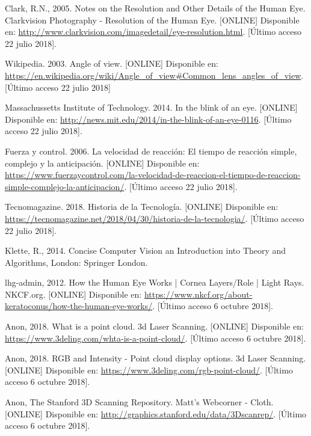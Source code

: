 \begin{thebibliography}{99}
 Clark, R.N., 2005. Notes on the Resolution and Other Details of the Human Eye. Clarkvision Photography - Resolution of the Human Eye. [ONLINE] Disponible en: \url{http://www.clarkvision.com/imagedetail/eye-resolution.html}. [Último acceso 22 julio 2018].



 Wikipedia. 2003. Angle of view. [ONLINE] Disponible en: \url{https://en.wikipedia.org/wiki/Angle_of_view#Common_lens_angles_of_view}. [Último acceso 22 julio 2018]

 Massachussetts Institute of Technology. 2014. In the blink of an eye. [ONLINE] Disponible en: \url{http://news.mit.edu/2014/in-the-blink-of-an-eye-0116}. [Último acceso 22 julio 2018].

 Fuerza y control. 2006. La velocidad de reacción: El tiempo de reacción simple, complejo y la anticipación. [ONLINE] Disponible en: \url{https://www.fuerzaycontrol.com/la-velocidad-de-reaccion-el-tiempo-de-reaccion-simple-complejo-la-anticipacion/}. [Último acceso 22 julio 2018].

 Tecnomagazine. 2018. Historia de la Tecnología. [ONLINE] Disponible en: \url{https://tecnomagazine.net/2018/04/30/historia-de-la-tecnologia/}. [Último acceso 22 julio 2018].

 Klette, R., 2014. Concise Computer Vision an Introduction into Theory and Algorithms, London: Springer London.

 lhg-admin, 2012. How the Human Eye Works | Cornea Layers/Role | Light Rays. NKCF.org. [ONLINE] Disponible en: \url{https://www.nkcf.org/about-keratoconus/how-the-human-eye-works/}. [Último acceso 6 octubre 2018].


 Anon, 2018. What is a point cloud. 3d Laser Scanning. [ONLINE] Disponible en: \url{https://www.3deling.com/whta-is-a-point-cloud/}. [Último acceso 6 octubre 2018].


 Anon, 2018. RGB and Intensity - Point cloud display options. 3d Laser Scanning. [ONLINE] Disponible en: \url{https://www.3deling.com/rgb-point-cloud/}. [Último acceso 6 octubre 2018].

 

 Anon, The Stanford 3D Scanning Repository. Matt's Webcorner - Cloth. [ONLINE] Disponible en: \url{http://graphics.stanford.edu/data/3Dscanrep/}. [Último acceso 6 octubre 2018].



\end{thebibliography}
